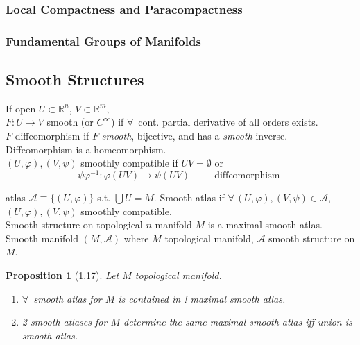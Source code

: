 \documentclass[11pt]{amsart}
\newtheorem{proposition}{Proposition}
\theoremstyle{definition}
\begin{document}
\subsubsection*{Local Compactness and Paracompactness}



\subsubsection*{Fundamental Groups of Manifolds}





\subsection*{Smooth Structures}

If open $U \subset \mathbb{R}^n$, $V \subset \mathbb{R}^m$, \\
$F:U \to V$ smooth (or $C^{\infty}$) if $\forall \, $ cont. partial derivative of all orders exists.  \\

$F$ diffeomorphism if $F$ \emph{smooth}, bijective, and has a \emph{smooth} inverse.  \\
Diffeomorphism is a homeomorphism.  \\

$(U, \varphi), (V,\psi)$ smoothly compatible if $UV = \emptyset$ or
\[
\psi \varphi^{-1}: \varphi(UV) \to \psi(UV) \quad \quad \, \text{ diffeomorphism }
\]

atlas $\mathcal{A} \equiv \lbrace (U, \varphi ) \rbrace$ s.t. $\bigcup U = M$.  Smooth atlas if $\forall \, (U,\varphi), (V, \psi) \in \mathcal{A}$, $(U,\varphi), (V,\psi)$ smoothly compatible.  \\

Smooth structure on topological $n$-manifold $M$ is a maximal smooth atlas.   \\

Smooth manifold $(M, \mathcal{A})$ where $M$ topological manifold, $\mathcal{A}$ smooth structure on $M$.   \\


\begin{proposition}[1.17] Let $M$ topological manifold.
\begin{enumerate}
\item[(a)] $\forall \, $ smooth atlas for $M$ is contained in ! maximal smooth atlas.
\item[(b)] 2 smooth atlases for $M$ determine the same maximal smooth atlas iff union is smooth atlas.
\end{enumerate}
\end{proposition}
\end{document}

